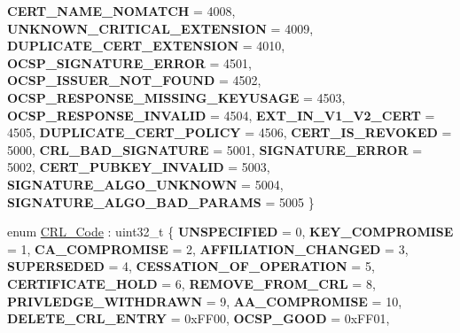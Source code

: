 \begin{DoxyCompactItemize}
{\bfseries C\+E\+R\+T\+\_\+\+N\+A\+M\+E\+\_\+\+N\+O\+M\+A\+T\+CH} = 4008, 
\newline
{\bfseries U\+N\+K\+N\+O\+W\+N\+\_\+\+C\+R\+I\+T\+I\+C\+A\+L\+\_\+\+E\+X\+T\+E\+N\+S\+I\+ON} = 4009, 
{\bfseries D\+U\+P\+L\+I\+C\+A\+T\+E\+\_\+\+C\+E\+R\+T\+\_\+\+E\+X\+T\+E\+N\+S\+I\+ON} = 4010, 
{\bfseries O\+C\+S\+P\+\_\+\+S\+I\+G\+N\+A\+T\+U\+R\+E\+\_\+\+E\+R\+R\+OR} = 4501, 
{\bfseries O\+C\+S\+P\+\_\+\+I\+S\+S\+U\+E\+R\+\_\+\+N\+O\+T\+\_\+\+F\+O\+U\+ND} = 4502, 
\newline
{\bfseries O\+C\+S\+P\+\_\+\+R\+E\+S\+P\+O\+N\+S\+E\+\_\+\+M\+I\+S\+S\+I\+N\+G\+\_\+\+K\+E\+Y\+U\+S\+A\+GE} = 4503, 
{\bfseries O\+C\+S\+P\+\_\+\+R\+E\+S\+P\+O\+N\+S\+E\+\_\+\+I\+N\+V\+A\+L\+ID} = 4504, 
{\bfseries E\+X\+T\+\_\+\+I\+N\+\_\+\+V1\+\_\+\+V2\+\_\+\+C\+E\+RT} = 4505, 
{\bfseries D\+U\+P\+L\+I\+C\+A\+T\+E\+\_\+\+C\+E\+R\+T\+\_\+\+P\+O\+L\+I\+CY} = 4506, 
\newline
{\bfseries C\+E\+R\+T\+\_\+\+I\+S\+\_\+\+R\+E\+V\+O\+K\+ED} = 5000, 
{\bfseries C\+R\+L\+\_\+\+B\+A\+D\+\_\+\+S\+I\+G\+N\+A\+T\+U\+RE} = 5001, 
{\bfseries S\+I\+G\+N\+A\+T\+U\+R\+E\+\_\+\+E\+R\+R\+OR} = 5002, 
{\bfseries C\+E\+R\+T\+\_\+\+P\+U\+B\+K\+E\+Y\+\_\+\+I\+N\+V\+A\+L\+ID} = 5003, 
\newline
{\bfseries S\+I\+G\+N\+A\+T\+U\+R\+E\+\_\+\+A\+L\+G\+O\+\_\+\+U\+N\+K\+N\+O\+WN} = 5004, 
{\bfseries S\+I\+G\+N\+A\+T\+U\+R\+E\+\_\+\+A\+L\+G\+O\+\_\+\+B\+A\+D\+\_\+\+P\+A\+R\+A\+MS} = 5005
 \}
\item 
enum \mbox{\hyperlink{namespace_botan_a557e654e0c387a4ef2521e3ece516ca7}{C\+R\+L\+\_\+\+Code}} \+: uint32\+\_\+t \{ \newline
{\bfseries U\+N\+S\+P\+E\+C\+I\+F\+I\+ED} = 0, 
{\bfseries K\+E\+Y\+\_\+\+C\+O\+M\+P\+R\+O\+M\+I\+SE} = 1, 
{\bfseries C\+A\+\_\+\+C\+O\+M\+P\+R\+O\+M\+I\+SE} = 2, 
{\bfseries A\+F\+F\+I\+L\+I\+A\+T\+I\+O\+N\+\_\+\+C\+H\+A\+N\+G\+ED} = 3, 
\newline
{\bfseries S\+U\+P\+E\+R\+S\+E\+D\+ED} = 4, 
{\bfseries C\+E\+S\+S\+A\+T\+I\+O\+N\+\_\+\+O\+F\+\_\+\+O\+P\+E\+R\+A\+T\+I\+ON} = 5, 
{\bfseries C\+E\+R\+T\+I\+F\+I\+C\+A\+T\+E\+\_\+\+H\+O\+LD} = 6, 
{\bfseries R\+E\+M\+O\+V\+E\+\_\+\+F\+R\+O\+M\+\_\+\+C\+RL} = 8, 
\newline
{\bfseries P\+R\+I\+V\+L\+E\+D\+G\+E\+\_\+\+W\+I\+T\+H\+D\+R\+A\+WN} = 9, 
{\bfseries A\+A\+\_\+\+C\+O\+M\+P\+R\+O\+M\+I\+SE} = 10, 
{\bfseries D\+E\+L\+E\+T\+E\+\_\+\+C\+R\+L\+\_\+\+E\+N\+T\+RY} = 0x\+F\+F00, 
{\bfseries O\+C\+S\+P\+\_\+\+G\+O\+OD} = 0x\+F\+F01, 
\newline

\end{DoxyCompactItemize}
